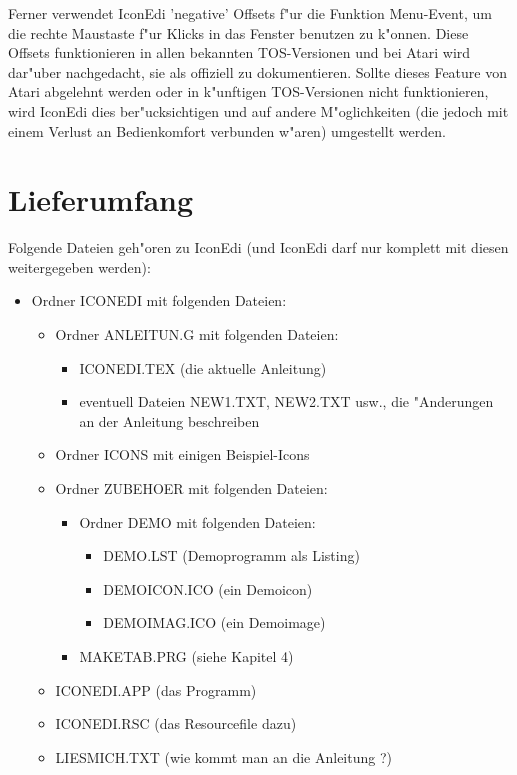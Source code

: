 \begin{appendix}
Ferner verwendet IconEdi 'negative' Offsets f"ur die Funktion
Menu-Event, um die rechte Maustaste f"ur Klicks in das Fenster
benutzen zu k"onnen. Diese Offsets funktionieren in allen bekannten
TOS-Versionen und bei Atari wird dar"uber nachgedacht, sie als 
offiziell zu dokumentieren. Sollte dieses Feature von Atari 
abgelehnt werden oder in k"unftigen TOS-Versionen nicht 
funktionieren, wird IconEdi dies ber"ucksichtigen und auf andere
M"oglichkeiten (die jedoch mit einem Verlust an Bedienkomfort
verbunden w"aren) umgestellt werden.


%
\setcounter{chapter}{11}
\chapter{Lieferumfang} 
 

Folgende Dateien geh"oren zu IconEdi (und IconEdi
darf nur komplett mit diesen weitergegeben werden):
\begin{itemize}
 \item Ordner ICONEDI mit folgenden Dateien:
  \begin{itemize} 
   \item Ordner ANLEITUN.G mit folgenden Dateien:
    \begin{itemize}
     \item ICONEDI.TEX (die aktuelle Anleitung)
     \item eventuell Dateien NEW1.TXT, NEW2.TXT usw., die 
           "Anderungen an der Anleitung beschreiben
    \end{itemize}
   \item Ordner ICONS mit einigen Beispiel-Icons
   \item Ordner ZUBEHOER mit folgenden Dateien:
    \begin{itemize}
     \item Ordner DEMO mit folgenden Dateien:
      \begin{itemize}
       \item DEMO.LST (Demoprogramm als Listing)
       \item DEMOICON.ICO  (ein Demoicon)
       \item DEMOIMAG.ICO  (ein Demoimage)
      \end{itemize}
     \item MAKETAB.PRG (siehe Kapitel 4)
    \end{itemize}
   \item ICONEDI.APP (das Programm)
   \item ICONEDI.RSC (das Resourcefile dazu)
   \item LIESMICH.TXT (wie kommt man an die Anleitung ?)
  \end{itemize}
\end{itemize}


\end{appendix}

